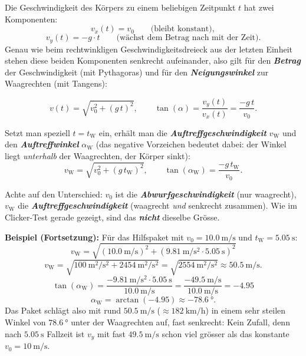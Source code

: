 \documentclass[addpoints,11pt,a4paper]{exam}
\begin{document}
\begin{theoriebox}
Die Geschwindigkeit des Körpers zu einem beliebigen Zeitpunkt $t$ hat zwei
Komponenten:
\[
  v_x(t) = v_0 \qquad \text{(bleibt konstant)},
\]
\[
  v_y(t) = -g\cdot t \qquad \text{(wächst dem Betrag nach mit der Zeit)}.
\]
Genau wie beim rechtwinkligen Geschwindigkeitsdreieck aus der letzten
Einheit stehen diese beiden Komponenten senkrecht aufeinander, also gilt
für den \textbf{\emph{Betrag}} der Geschwindigkeit (mit Pythagoras) und
für den \textbf{\emph{Neigungswinkel}} zur Waagrechten (mit Tangens):
\begin{formelbox}
\[
  \boxed{v(t) = \sqrt{v_0^2 + (g\,t)^2}}, \qquad \boxed{\tan(\alpha) = \frac{v_y(t)}{v_x(t)} = \frac{-g\,t}{v_0}}.
\]
\end{formelbox}
Setzt man speziell $t=t_{\text{W}}$ ein, erhält man die
\textbf{\emph{Auftreffgeschwindigkeit}} $v_{\text{W}}$ und den
\textbf{\emph{Auftreffwinkel}} $\alpha_{\text{W}}$ (das negative Vorzeichen
bedeutet dabei: der Winkel liegt \emph{unterhalb} der Waagrechten, der
Körper sinkt):
\[
  \boxed{v_{\text{W}} = \sqrt{v_0^2 + (g\,t_{\text{W}})^2}}, \qquad \boxed{\tan(\alpha_{\text{W}}) = \frac{-g\,t_{\text{W}}}{v_0}}.
\]

\begin{hinweisbox}
Achte auf den Unterschied: $v_0$ ist die \textbf{\emph{Abwurfgeschwindigkeit}}
(nur waagrecht), $v_{\text{W}}$ die \textbf{\emph{Auftreffgeschwindigkeit}}
(waagrecht \emph{und} senkrecht zusammen). Wie im Clicker-Test gerade
gezeigt, sind das \textbf{\emph{nicht}} dieselbe Grösse.
\end{hinweisbox}

\textbf{Beispiel (Fortsetzung):} Für das Hilfspaket mit
$v_0=\SI{10.0}{\meter\per\second}$ und $t_{\text{W}}=\SI{5.05}{\second}$:
\[
  v_{\text{W}} = \sqrt{(\SI{10.0}{\meter\per\second})^2 + (\SI{9.81}{\meter\per\second\squared}\cdot\SI{5.05}{\second})^2}
\]
\[
  v_{\text{W}} = \sqrt{\SI{100}{\meter\squared\per\second\squared} + \SI{2454}{\meter\squared\per\second\squared}} = \sqrt{\SI{2554}{\meter\squared\per\second\squared}} \approx \SI{50.5}{\meter\per\second}.
\]
\[
  \tan(\alpha_{\text{W}}) = \frac{-\SI{9.81}{\meter\per\second\squared}\cdot\SI{5.05}{\second}}{\SI{10.0}{\meter\per\second}} = \frac{-\SI{49.5}{\meter\per\second}}{\SI{10.0}{\meter\per\second}} = -4.95
\]
\[
  \alpha_{\text{W}} = \arctan(-4.95) \approx \SI{-78.6}{\degree}.
\]
Das Paket schlägt also mit rund $\SI{50.5}{\meter\per\second}$
($\approx\SI{182}{\kilo\meter\per\hour}$) in einem sehr steilen Winkel von
$\SI{78.6}{\degree}$ unter der Waagrechten auf, fast senkrecht: Kein
Zufall, denn nach $\SI{5.05}{\second}$ Fallzeit ist $v_y$ mit fast
$\SI{49.5}{\meter\per\second}$ schon viel grösser als das konstante
$v_0=\SI{10}{\meter\per\second}$.
\end{theoriebox}
\end{document}

